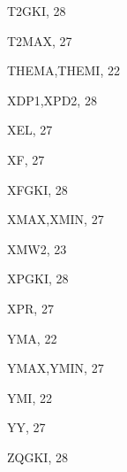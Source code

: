 \documentclass[10pt]{article} \usepackage{dina4}
\begin{document}
\begin{theindex}
  \indexspace

  \item T2GKI, 28
  \item T2MAX, 27
  \item THEMA,THEMI, 22

  \indexspace

  \item XDP1,XPD2, 28
  \item XEL, 27
  \item XF, 27
  \item XFGKI, 28
  \item XMAX,XMIN, 27
  \item XMW2, 23
  \item XPGKI, 28
  \item XPR, 27

  \indexspace

  \item YMA, 22
  \item YMAX,YMIN, 27
  \item YMI, 22
  \item YY, 27

  \indexspace

  \item ZQGKI, 28

\end{theindex}
\end{document}
